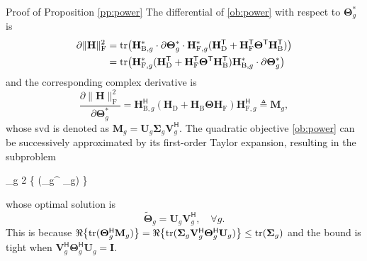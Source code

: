 \documentclass[journal]{IEEEtran}
\begin{document}
\begin{appendix}
	\begin{subsection}{Proof of Proposition \ref{pp:power}}
		\label{ap:power}
		The differential of \eqref{ob:power} with respect to $\mathbf{\Theta}_g^*$ is
		\begin{align*}
			\partial \lVert \mathbf{H} \rVert _\mathrm{F}^2
			& = \operatorname{tr}\bigl(\mathbf{H}_{\mathrm{B},g}^* \cdot \partial \mathbf{\Theta}_g^* \cdot \mathbf{H}_{\mathrm{F},g}^* (\mathbf{H}_\mathrm{D}^\mathsf{T} + \mathbf{H}_\mathrm{F}^\mathsf{T} \mathbf{\Theta}^\mathsf{T} \mathbf{H}_\mathrm{B}^\mathsf{T})\bigr) \\
			& = \operatorname{tr}\bigl(\mathbf{H}_{\mathrm{F},g}^* (\mathbf{H}_\mathrm{D}^\mathsf{T} + \mathbf{H}_\mathrm{F}^\mathsf{T} \mathbf{\Theta}^\mathsf{T} \mathbf{H}_\mathrm{B}^\mathsf{T}) \mathbf{H}_{\mathrm{B},g}^* \cdot \partial \mathbf{\Theta}_g^*\bigr)
		\end{align*}
		and the corresponding complex derivative is
		\begin{equation}
			\frac{\partial \lVert \mathbf{H} \rVert _\mathrm{F}^2}{\partial \mathbf{\Theta}_g^*} = \mathbf{H}_{\mathrm{B},g}^\mathsf{H} (\mathbf{H}_\mathrm{D} + \mathbf{H}_\mathrm{B} \mathbf{\Theta} \mathbf{H}_\mathrm{F}) \mathbf{H}_{\mathrm{F},g}^\mathsf{H} \triangleq \mathbf{M}_g,
		\end{equation}
		whose \gls{svd} is denoted as $\mathbf{M}_g = \mathbf{U}_g \mathbf{\Sigma}_g \mathbf{V}_g^\mathsf{H}$.
		The quadratic objective \eqref{ob:power} can be successively approximated by its first-order Taylor expansion, resulting in the subproblem
		\begin{maxi!}
			{\scriptstyle{\mathbf{\Theta}}}{\sum_g 2 \Re\bigl\{ \tr(\mathbf{\Theta}_g^ _g) \bigr\}}{\label{op:power_ris_taylor}}{\label{ob:power_ris_taylor}}
		\end{maxi!}
		whose optimal solution is
		\begin{equation}
			\label{eq:ris_power_taylor}
			\tilde{\mathbf{\Theta}}_g = \mathbf{U}_g \mathbf{V}_g^\mathsf{H}, \quad \forall g.
		\end{equation}
		This is because $\Re \bigl\{\operatorname{tr}(\mathbf{\Theta}_g^\mathsf{H} \mathbf{M}_g)\bigr\} = \Re \bigl\{ \operatorname{tr}(\mathbf{\Sigma}_g \mathbf{V}_g^\mathsf{H} \mathbf{\Theta}_g^\mathsf{H} \mathbf{U}_g) \bigr\} \le \operatorname{tr}(\mathbf{\Sigma}_g)$ and the bound is tight when $\mathbf{V}_g^\mathsf{H} \mathbf{\Theta}_g^\mathsf{H} \mathbf{U}_g = \mathbf{I}$.


\end{subsection}
\end{appendix}
\end{document}
